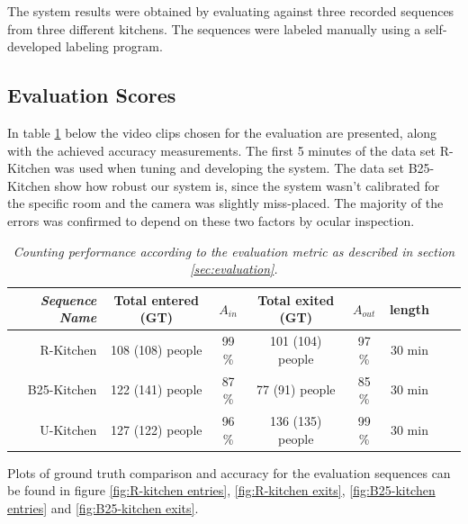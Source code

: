 The system results were obtained by evaluating against three recorded sequences from three different kitchens. The sequences were labeled manually using a self-developed labeling program.

\subsection{Evaluation Scores}
In table \ref{tab:evaluation_performance} below the video clips chosen for the evaluation are presented, along with the achieved accuracy measurements. The first 5 minutes of the data set R-Kitchen was used when tuning and developing the system. The data set B25-Kitchen show how robust our system is, since the system wasn't calibrated for the specific room and the camera was slightly miss-placed. The majority of the errors was confirmed to depend on these two factors by ocular inspection.

\begin{table}[h]
\centering
	\begin{tabular}{r | c | c | c | c | c | c | c }
	\emph{Sequence Name}		&  Total entered (GT) & \emph{$A_{in}$} & Total exited (GT) & \emph{$A_{out}$} & length \\
		\hline \hline
		R-Kitchen			& 108 (108) people & 99 \% & 101 (104) people & 97 \% & 30 min\\
		B25-Kitchen			& 122 (141) people & 87 \% & 77 (91) people & 85 \% & 30 min \\
		U-Kitchen			& 127 (122) people & 96 \% & 136 (135) people & 99 \% & 30 min  \\
		\end{tabular}
	\caption[System performance]{\textit{Counting performance according to the evaluation metric as described in section \ref{sec:evaluation}.}}
	\label{tab:evaluation_performance}
\end{table}

Plots of ground truth comparison and accuracy for the evaluation sequences can be found in figure \ref{fig:R-kitchen entries}, \ref{fig:R-kitchen exits}, \ref{fig:B25-kitchen entries} and \ref{fig:B25-kitchen exits}.

